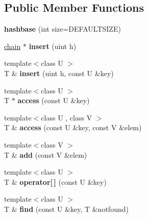 \subsection*{Public Member Functions}
\begin{DoxyCompactItemize}
\item 
\mbox{\label{structhashbase_af21a8ef4ce7ae76ebab5971533521a59}} 
{\bfseries hashbase} (int size=D\+E\+F\+A\+U\+L\+T\+S\+I\+ZE)
\item 
\mbox{\label{structhashbase_ad04058aa2b5a25cb6c61236d3d2b542f}} 
\hyperlink{structhashbase_1_1chain}{chain} $\ast$ {\bfseries insert} (uint h)
\item 
\mbox{\label{structhashbase_abd035efc8a331bfb0856bfe1ba6e9a55}} 
{\footnotesize template$<$class U $>$ }\\T \& {\bfseries insert} (uint h, const U \&key)
\item 
\mbox{\label{structhashbase_a12163e20ba78e48400771dbd6b8cbe5b}} 
{\footnotesize template$<$class U $>$ }\\T $\ast$ {\bfseries access} (const U \&key)
\item 
\mbox{\label{structhashbase_ab52626a876edc969af522e2c94658dbd}} 
{\footnotesize template$<$class U , class V $>$ }\\T \& {\bfseries access} (const U \&key, const V \&elem)
\item 
\mbox{\label{structhashbase_a6c546956b0685adbde081c0fe1bb5c42}} 
{\footnotesize template$<$class V $>$ }\\T \& {\bfseries add} (const V \&elem)
\item 
\mbox{\label{structhashbase_a55e85b351ca5cf32978f5c08ef413f9b}} 
{\footnotesize template$<$class U $>$ }\\T \& {\bfseries operator\mbox{[}$\,$\mbox{]}} (const U \&key)
\item 
\mbox{\label{structhashbase_ae0be9b1b7ef3e6fa27b2fdfff0482d80}} 
{\footnotesize template$<$class U $>$ }\\T \& {\bfseries find} (const U \&key, T \&notfound)
\item 

\end{DoxyCompactItemize}
